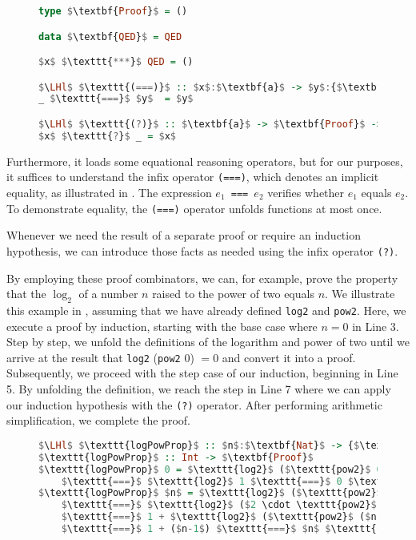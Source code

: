 \documentclass{clmthesis}
\begin{document}
\begin{figure}[h]
\begin{lstlisting}[mathescape=true, language=haskell, caption={\texttt{ProofCombinators}.},captionpos=b, label=fig:prooffun]
type $\textbf{Proof}$ = ()

data $\textbf{QED}$ = QED

$x$ $\texttt{***}$ QED = ()

$\LHl$ $\texttt{(===)}$ :: $x$:$\textbf{a}$ -> $y$:{$\textbf{a}$ | $y == x$} -> {$v$:$\textbf{a}$ | $v == x$ && $v == y$} $\LHr$
_ $\texttt{===}$ $y$  = $y$

$\LHl$ $\texttt{(?)}$ :: $\textbf{a}$ -> $\textbf{Proof}$ -> $\textbf{a}$ $\LHr$
$x$ $\texttt{?}$ _ = $x$ 
\end{lstlisting}
\end{figure}
Furthermore, it loads some equational reasoning operators, but for our purposes, it suffices to understand the infix operator \texttt{(===)}, which denotes an implicit equality, as illustrated in . The expression \texttt{$e_1$ === $e_2$} verifies whether $e_1$ equals $e_2$. To demonstrate equality, the \texttt{(===)} operator unfolds functions at most once.

Whenever we need the result of a separate proof or require an induction hypothesis, we can introduce those facts as needed using the infix operator \texttt{(?)}.

By employing these proof combinators, we can, for example, prove the property that the $\log_2$ of a number $n$ raised to the power of two equals $n$. We illustrate this example in , assuming that we have already defined \texttt{log2} and \texttt{pow2}. Here, we execute a proof by induction, starting with the base case where $n=0$ in Line 3. Step by step, we unfold the definitions of the logarithm and power of two until we arrive at the result that \texttt{log2} (\texttt{pow2} $0$) $= 0$ and convert it into a proof. Subsequently, we proceed with the step case of our induction, beginning in Line 5. By unfolding the definition, we reach the step in Line 7 where we can apply our induction hypothesis with the \texttt{(?)} operator. After performing arithmetic simplification, we complete the proof.

\begin{figure}[h]
\begin{lstlisting}[mathescape=true, language=haskell, caption={Proof \texttt{logPowProp}.},captionpos=b, label=fig:logpow]
$\LHl$ $\texttt{logPowProp}$ :: $n$:$\textbf{Nat}$ -> {$\texttt{log2}$ ($\texttt{pow2}$ $n$) $==$ $n$} $\LHr$
$\texttt{logPowProp}$ :: Int -> $\textbf{Proof}$
$\texttt{logPowProp}$ 0 = $\texttt{log2}$ ($\texttt{pow2}$ 0) 
	$\texttt{===}$ $\texttt{log2}$ 1 $\texttt{===}$ 0 $\texttt{***}$ QED
$\texttt{logPowProp}$ $n$ = $\texttt{log2}$ ($\texttt{pow2}$ $n$) 
	$\texttt{===}$ $\texttt{log2}$ ($2 \cdot \texttt{pow2}$ ($n-1$)) 
	$\texttt{===}$ 1 + $\texttt{log2}$ ($\texttt{pow2}$ ($n-1$)) $\texttt{?}$ $\texttt{logPowProp}$ ($n-1$)
	$\texttt{===}$ 1 + ($n-1$) $\texttt{===}$ $n$ $\texttt{***}$ QED
\end{lstlisting}
\end{figure}
\end{document}
